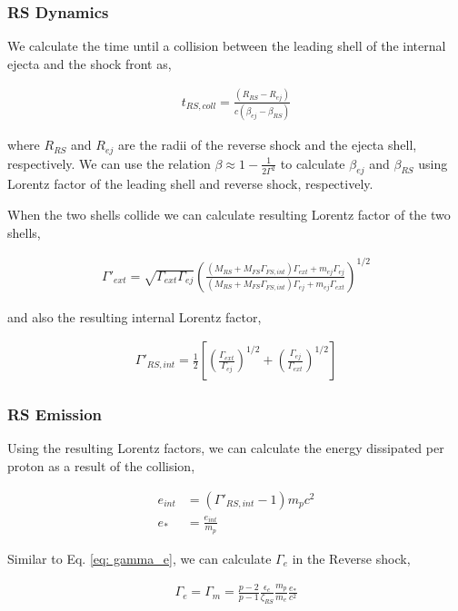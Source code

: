 \documentclass[linenumbers,twocolumn]{aastex631}
\begin{document}
\subsubsection{RS Dynamics}

We calculate the time until a collision between the leading shell of the internal ejecta and the shock front as,

\begin{align}
	t_{RS,coll} = \frac{(R_{RS} - R_{ej})}{c(\beta_{ej} - \beta_{RS})}
\end{align}

where $R_{RS}$ and $R_{ej}$ are the radii of the reverse shock and the ejecta shell, respectively. We can use the relation $\beta \approx 1 - \frac{1}{2\Gamma^2}$ to calculate $\beta_{ej}$ and $\beta_{RS}$ using Lorentz factor of the leading shell and reverse shock, respectively.

When the two shells collide we can calculate resulting Lorentz factor of the two shells, 

\begin{align}
	\Gamma'_{ext} = \sqrt{\Gamma_{ext}\Gamma_{ej}}\left(\frac{(M_{RS} + M_{FS}\Gamma_{FS,int})\Gamma_{ext} + m_{ej}\Gamma_{ej}}{(M_{RS} + M_{FS}\Gamma_{FS,int})\Gamma_{ej} + m_{ej}\Gamma_{ext}}\right)^{1/2}
\end{align}

and also the resulting internal Lorentz factor,

\begin{align}
	\Gamma'_{RS,int} = \frac{1}{2} \left[\left(\frac{\Gamma_{ext}}{\Gamma_{ej}}\right)^{1/2} + \left(\frac{\Gamma_{ej}}{\Gamma_{ext}}\right)^{1/2} \right]
\end{align}

\subsubsection{RS Emission}

Using the resulting Lorentz factors, we can calculate the energy dissipated per proton as a result of the collision, 

\begin{align}
	e_{int} &= (\Gamma'_{RS,int} - 1) m_p c^2 \\
	e_* &= \frac{e_{int}}{m_p}
\end{align}

Similar to Eq. \ref{eq: gamma_e}, we can calculate $\Gamma_e$ in the Reverse shock,

\begin{align} \label{eq: gamma_e}
	\Gamma_e = \Gamma_m = \frac{p-2}{p-1} \frac{\epsilon_e}{\zeta_{RS}} \frac{m_p}{m_e} \frac{e_*}{c^2}
\end{align}
\end{document}
